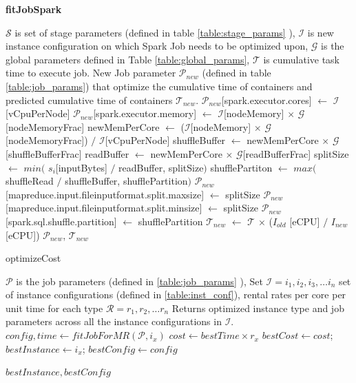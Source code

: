 \renewcommand{\algorithmicrequire}{\textbf{Input:}}
\renewcommand{\algorithmicensure}{\textbf{Output:}}
\renewcommand{\algorithmiccomment}[1]{// #1}
\begin{algorithm}
\caption{\textbf{fitJobSpark}}\label{jobfitspark}
\begin{algorithmic}[1]
\footnotesize
\REQUIRE  $\mathcal{S}$ is set of stage parameters (defined in table \ref{table:stage_params} ), $\mathcal{I}$ is new instance configuration on which Spark Job needs to be optimized upon, $\mathcal{G}$ is the global parameters defined in Table \ref{table:global_params}, $\mathcal{T}$ is cumulative task time to execute job.
\ENSURE New Job parameter $\mathcal{P}_{new}$ (defined in table \ref{table:job_params}) that optimize the cumulative time of containers and predicted cumulative time of containers $\mathcal{T}_{new}$.
\STATE $\mathcal{P}_{new}$[spark.executor.cores] $\gets$ $\mathcal{I}$ [vCpuPerNode]
\STATE $\mathcal{P}_{new}$[spark.executor.memory] $\gets$ $\mathcal{I}$[nodeMemory] $\times$ $\mathcal{G}$[nodeMemoryFrac]
\STATE newMemPerCore $\gets$ ($\mathcal{I}$[nodeMemory] $\times$ $\mathcal{G}$[nodeMemoryFrac]) $/$ $\mathcal{I}$[vCpuPerNode]
\STATE shuffleBuffer $\gets$ newMemPerCore $\times$ $\mathcal{G}$[shuffleBufferFrac]
\STATE readBuffer $\gets$ newMemPerCore $\times$ $\mathcal{G}$[readBufferFrac]
\STATE splitSize $\gets$ $min($ $s_{i}$[inputBytes] $/$  readBuffer, splitSize$)$ 
\STATE shufflePartiton $\gets$ $max($shuffleRead $/$ shuffleBuffer, shufflePartition$)$
\ENDFOR
\STATE $\mathcal{P}_{new}$[mapreduce.input.fileinputformat.split.maxsize] $\gets$ splitSize
\STATE $\mathcal{P}_{new}$[mapreduce.input.fileinputformat.split.minsize] $\gets$ splitSize
\STATE $\mathcal{P}_{new}$[spark.sql.shuffle.partition] $\gets$ shufflePartition
\STATE $\mathcal{T}_{new}$ $\gets$ $\mathcal{T}$ $\times$ ($I_{old}$ [eCPU] $/$ $I_{new}$[eCPU])
\RETURN $\mathcal{P}_{new}$, $\mathcal{T}_{new}$
\end{algorithmic}
\end{algorithm}

\begin{algorithm}
\caption{optimizeCost} \label{cost_optimize}
\begin{algorithmic}[1]
\footnotesize
\REQUIRE $\mathcal{P}$ is the job parameters (defined in \ref{table:job_params} ), Set $\mathcal{I} = {i_1, i_2, i_3, \ldots i_n} $ set of instance configurations (defined in \ref{table:inst_conf}), rental rates per core per unit time for each type $\mathcal{R}={r_1, r_2, \ldots r_n}$
\ENSURE Returns optimized instance type and job parameters across all the instance configurations in $\mathcal{I}$.
	\STATE $config, time \gets fitJobForMR(\mathcal{P}, i_x)$
	\STATE $cost \gets  bestTime \times r_x$  
		\STATE $bestCost \gets cost$;
		$bestInstance \gets i_x$;
		$bestConfig \gets config$
	\ENDIF
\ENDFOR

\RETURN $bestInstance, bestConfig$
\end{algorithmic}
\end{algorithm}

